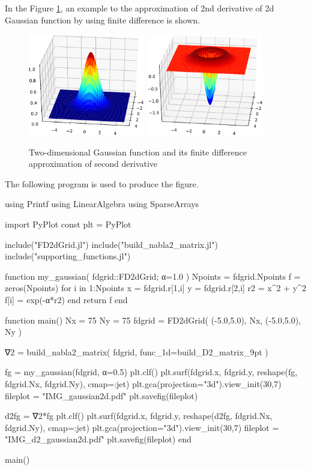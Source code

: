 In the Figure \ref{fig:fd_gaussian_2d}, an example to the approximation of 2nd derivative
of 2d Gaussian function by using finite difference is shown.

\begin{figure}[H]
{\center
\includegraphics[width=0.45\textwidth]{../codes/FD2d/IMG_gaussian2d.pdf}\,%
\includegraphics[width=0.45\textwidth]{../codes/FD2d/IMG_d2_gaussian2d.pdf}
\par}
\caption{Two-dimensional Gaussian function and its finite difference
approximation of second derivative}
\label{fig:fd_gaussian_2d}
\end{figure}

The following program is used to produce the figure.
\begin{juliacode}
using Printf
using LinearAlgebra
using SparseArrays
    
import PyPlot
const plt = PyPlot
    
include("FD2dGrid.jl")
include("build_nabla2_matrix.jl")
include("supporting_functions.jl")
    
function my_gaussian( fdgrid::FD2dGrid; α=1.0 )
  Npoints = fdgrid.Npoints
  f = zeros(Npoints)
  for i in 1:Npoints
    x = fdgrid.r[1,i]
    y = fdgrid.r[2,i]
    r2 = x^2 + y^2
    f[i] = exp(-α*r2)
  end
  return f
end
    
function main()  
  Nx = 75
  Ny = 75
  fdgrid = FD2dGrid( (-5.0,5.0), Nx, (-5.0,5.0), Ny )
    
  ∇2 = build_nabla2_matrix( fdgrid, func_1d=build_D2_matrix_9pt )
    
  fg = my_gaussian(fdgrid, α=0.5)
  plt.clf()
  plt.surf(fdgrid.x, fdgrid.y, reshape(fg, fdgrid.Nx, fdgrid.Ny), cmap=:jet)
  plt.gca(projection="3d").view_init(30,7)
  fileplot = "IMG_gaussian2d.pdf"
  plt.savefig(fileplot)
    
  d2fg = ∇2*fg    
  plt.clf()
  plt.surf(fdgrid.x, fdgrid.y, reshape(d2fg, fdgrid.Nx, fdgrid.Ny), cmap=:jet)
  plt.gca(projection="3d").view_init(30,7)    
  fileplot = "IMG_d2_gaussian2d.pdf"
  plt.savefig(fileplot)
end
    
main()    
\end{juliacode}


